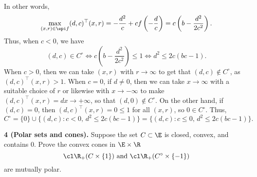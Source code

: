 \documentclass[../borwein-lewis_notes.tex]{subfiles}
\begin{document}
\begin{enumerate}[(a)]
{In other words, 
\begin{equation*}
\max_{(x,r)\in\epi f} (d,c)^\top(x,r) = -\frac{d^2}{c} + cf\left(-
\frac{d}{c}\right) = c\left(b-\frac{d^2}{2c^2}\right).
\end{equation*}
Thus, when $c<0$, we have 
\begin{equation*}
(d,c)\in C^{\circ}\iff c\left(b-\frac{d^2}{2c^2}\right)\leq 1 
\iff d^2 \leq 2c(bc-1).
\end{equation*}
When $c>0$, then we can take $(x,r)$ with $r\to\infty$ to get that 
$(d,c)\notin C^{\circ}$, as $(d,c)^\top(x,r) > 1$. When $c=0$,
if $d\neq 0$, then we can take $x\to \infty$ with a suitable choice of 
$r$ or likewise with $x\to -\infty$ to make $(d,c)^\top (x,r) 
= dx \to +\infty$, so that $(d,0)\notin C^{\circ}$. On the other 
hand, if $(d,c) = 0$, then $(d,c)^\top (x,r) = 0 \leq 1$ for all 
$(x,r)$, so $0\in C^{\circ}$. Thus, 
\begin{equation*}
C^{\circ} = \{0\} \cup \{(d,c): c<0,\, d^2 \leq 2c(bc-1)\}
= \{(d,c) : c\leq 0,\, d^2 \leq 2c(bc-1)\}.
\end{equation*}
}
\end{enumerate}
\noindent
\textbf{4 (Polar sets and cones).} Suppose the set $C\subset\E$ is 
closed, convex, and contains 0. Prove the convex cones in $\E\times \R$
\begin{equation*}
\cl\R_+(C\times\{1\}) \text{ and } \cl\R_+(C^\circ\times\{-1\})
\end{equation*}
are mutually polar.
\end{document}
